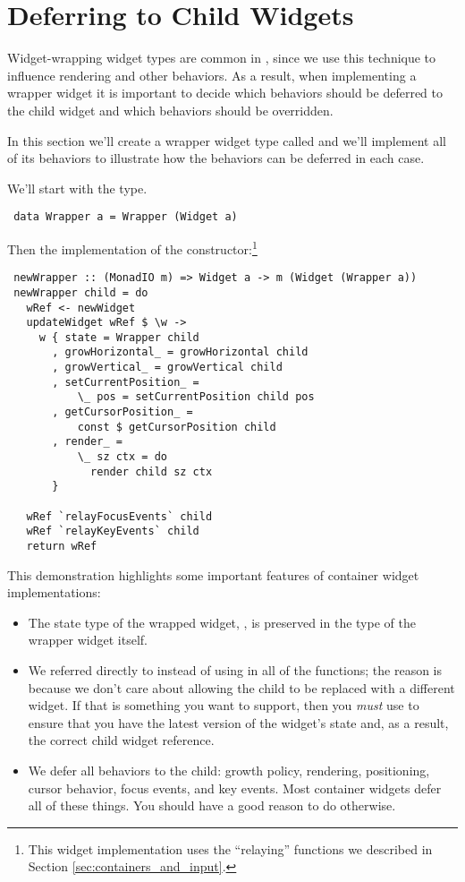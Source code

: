 \section{Deferring to Child Widgets}
\label{sec:deferring}

Widget-wrapping widget types are common in \vtyui, since we use this
technique to influence rendering and other behaviors.  As a result,
when implementing a wrapper widget it is important to decide which
behaviors should be deferred to the child widget and which behaviors
should be overridden.

In this section we'll create a wrapper widget type called 
and we'll implement all of its behaviors to illustrate how the
behaviors can be deferred in each case.

We'll start with the type.

\begin{verbatim}
 data Wrapper a = Wrapper (Widget a)
\end{verbatim}

Then the implementation of the constructor:\footnote{This widget
  implementation uses the ``relaying'' functions we described in
  Section \ref{sec:containers_and_input}.}

\begin{verbatim}
 newWrapper :: (MonadIO m) => Widget a -> m (Widget (Wrapper a))
 newWrapper child = do
   wRef <- newWidget
   updateWidget wRef $ \w ->
     w { state = Wrapper child
       , growHorizontal_ = growHorizontal child
       , growVertical_ = growVertical child
       , setCurrentPosition_ =
           \_ pos = setCurrentPosition child pos
       , getCursorPosition_ =
           const $ getCursorPosition child
       , render_ =
           \_ sz ctx = do
             render child sz ctx
       }

   wRef `relayFocusEvents` child
   wRef `relayKeyEvents` child
   return wRef
\end{verbatim}

This demonstration highlights some important features of container
widget implementations:

\begin{itemize}
\item The state type of the wrapped widget, , is preserved in
  the type of the wrapper widget itself.
\item We referred directly to  instead of using
   in all of the functions; the reason is because we
  don't care about allowing the child to be replaced with a different
  widget.  If that is something you want to support, then you
  \textit{must} use  to ensure that you have the latest
  version of the widget's state and, as a result, the correct child
  widget reference.
\item We defer all behaviors to the child: growth policy, rendering,
  positioning, cursor behavior, focus events, and key events.  Most
  container widgets defer all of these things.  You should have a good
  reason to do otherwise.
\end{itemize}

